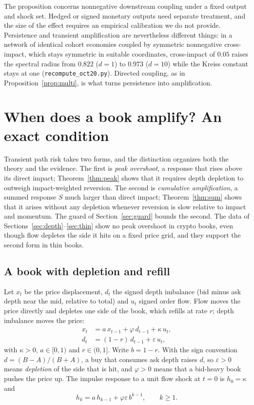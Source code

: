 \documentclass[12pt]{article}
\theoremstyle{definition}
\theoremstyle{remark}
\begin{document}
The proposition concerns nonnegative downstream coupling under a fixed output and shock set. Hedged or signed monetary outputs need separate treatment, and the size of the effect requires an empirical calibration we do not provide. Persistence and transient amplification are nevertheless different things: in a network of identical cohort economies coupled by symmetric nonnegative cross-impact, which stays symmetric in suitable coordinates, cross-impact of $0.05$ raises the spectral radius from $0.822$ ($d=1$) to $0.973$ ($d=10$) while the Kreiss constant stays at one (\texttt{recompute\_oct20.py}). Directed coupling, as in Proposition~\ref{prop:multi}, is what turns persistence into amplification.
\section{When does a book amplify? An exact condition}\label{sec:t6}

Transient path risk takes two forms, and the distinction organizes both the theory and the evidence. The first is \emph{peak overshoot}, a response that rises above its direct impact; Theorem~\ref{thm:peak} shows that it requires depth depletion to outweigh impact-weighted reversion. The second is \emph{cumulative amplification}, a summed response $S$ much larger than direct impact; Theorem~\ref{thm:sum} shows that it arises without any depletion whenever reversion is slow relative to impact and momentum. The guard of Section~\ref{sec:guard} bounds the second. The data of Sections~\ref{sec:depth}--\ref{sec:thin} show no peak overshoot in crypto books, even though flow depletes the side it hits on a fixed price grid, and they support the second form in thin books.

\subsection{A book with depletion and refill}
Let $x_t$ be the price displacement, $d_t$ the signed depth imbalance (bid minus ask depth near the mid, relative to total) and $u_t$ signed order flow. Flow moves the price directly and depletes one side of the book, which refills at rate $r$; depth imbalance moves the price:
\begin{align}
x_t &= a\,x_{t-1} + \varphi\,d_{t-1} + \kappa\,u_t, \label{eq:x}\\
d_t &= (1-r)\,d_{t-1} + \varepsilon\,u_t, \label{eq:d}
\end{align}
with $\kappa>0$, $a\in[0,1)$ and $r\in(0,1]$. Write $b=1-r$. With the sign convention $d=(B-A)/(B+A)$, a buy that consumes ask depth raises $d$, so $\varepsilon>0$ means \emph{depletion} of the side that is hit, and $\varphi>0$ means that a bid-heavy book pushes the price up. The impulse response to a unit flow shock at $t=0$ is $h_0=\kappa$ and
\begin{equation}\label{eq:rec}
h_k=a\,h_{k-1}+\varphi\varepsilon\,b^{k-1},\qquad k\ge1.
\end{equation}
\end{document}
